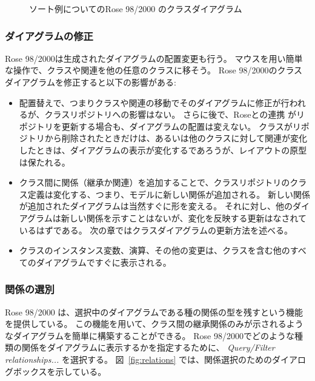 \documentclass[\pformat,12pt]{jarticle}
\newcommand{\link}{Roseとの連携}
\newcommand{\rose}{Rose 98/2000}
\begin{document}
\begin{figure}[htb]
\begin{center}
\mbox{}
\caption{ソート例についての\rose{} のクラスダイアグラム　\label{fig:classdiagram}}
\end{center}
\end{figure}

\subsubsection*{ダイアグラムの修正}

\rose{}は生成されたダイアグラムの配置変更も行う。
マウスを用い簡単な操作で、クラスや関連を他の任意のクラスに移そう。
\rose{}のクラスダイアグラムを修正すると以下の影響がある:  

\begin{itemize}
\item 配置替えで、つまりクラスや関連の移動でそのダイアグラムに修正が行われるが、クラスリポジトリへの影響はない。
さらに後で、\link{} がリポジトリを更新する場合も、ダイアグラムの配置は変えない。
クラスがリポジトリから削除されたときだけは、あるいは他のクラスに対して関連が変化したときは、ダイアグラムの表示が変化するであろうが、レイアウトの原型は保たれる。
\item クラス間に関係（継承か関連）を追加することで、クラスリポジトリのクラス定義は変化する、つまり、モデルに新しい関係が追加される。
新しい関係が追加されたダイアグラムは当然すぐに形を変える。
それに対し、他のダイアグラムは新しい関係を示すことはないが、変化を反映する更新はなされているはずである。
次の章ではクラスダイアグラムの更新方法を述べる。
\item クラスのインスタンス変数、演算、その他の変更は、クラスを含む他のすべてのダイアグラムですぐに表示される。
\end{itemize}

\subsubsection*{関係の選別}
 
\rose{} は、選択中のダイアグラムである種の関係の型を残すという機能を提供している。
この機能を用いて、クラス間の継承関係のみが示されるようなダイアグラムを簡単に構築することができる。
 \rose{}でどのような種類の関係をダイアグラムに表示するかを指定するために、 {\it Query/Filter relationships...} を選択する。
図~\ref{fig:relations} では、関係選択のためのダイアログボックスを示している。
\end{document}
